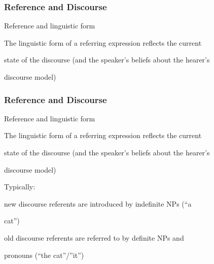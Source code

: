 \documentclass[compress,color=usenames]{beamer}
\begin{document}
\begin{frame}
\frametitle{
Reference and Discourse}






Reference and linguistic form



The linguistic form of a referring expression reﬂects the current



state of the discourse (and the speaker's beliefs about the hearer's



discourse model)










\end{frame}
\begin{frame}
\frametitle{
Reference and Discourse}






Reference and linguistic form



The linguistic form of a referring expression reﬂects the current



state of the discourse (and the speaker's beliefs about the hearer's



discourse model)



Typically:



new discourse referents are introduced by indeﬁnite NPs ({``}a



cat'')



old discourse referents are referred to by deﬁnite NPs and



pronouns ({``}the cat''/''it'')










\end{frame}
\end{document}
